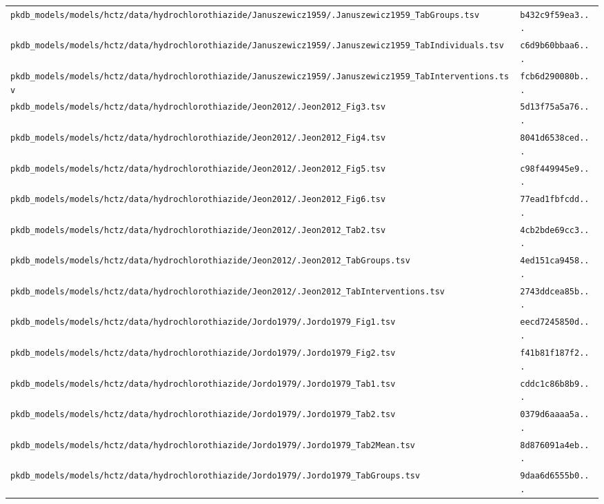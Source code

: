 \begin{longtable}{ll}
\texttt{pkdb\_models/models/hctz/data/hydrochlorothiazide/Januszewicz1959/.Januszewicz1959\_TabGroups.tsv} & \texttt{b432c9f59ea3...} \\
\texttt{pkdb\_models/models/hctz/data/hydrochlorothiazide/Januszewicz1959/.Januszewicz1959\_TabIndividuals.tsv} & \texttt{c6d9b60bbaa6...} \\
\texttt{pkdb\_models/models/hctz/data/hydrochlorothiazide/Januszewicz1959/.Januszewicz1959\_TabInterventions.tsv} & \texttt{fcb6d290080b...} \\
\texttt{pkdb\_models/models/hctz/data/hydrochlorothiazide/Jeon2012/.Jeon2012\_Fig3.tsv} & \texttt{5d13f75a5a76...} \\
\texttt{pkdb\_models/models/hctz/data/hydrochlorothiazide/Jeon2012/.Jeon2012\_Fig4.tsv} & \texttt{8041d6538ced...} \\
\texttt{pkdb\_models/models/hctz/data/hydrochlorothiazide/Jeon2012/.Jeon2012\_Fig5.tsv} & \texttt{c98f449945e9...} \\
\texttt{pkdb\_models/models/hctz/data/hydrochlorothiazide/Jeon2012/.Jeon2012\_Fig6.tsv} & \texttt{77ead1fbfcdd...} \\
\texttt{pkdb\_models/models/hctz/data/hydrochlorothiazide/Jeon2012/.Jeon2012\_Tab2.tsv} & \texttt{4cb2bde69cc3...} \\
\texttt{pkdb\_models/models/hctz/data/hydrochlorothiazide/Jeon2012/.Jeon2012\_TabGroups.tsv} & \texttt{4ed151ca9458...} \\
\texttt{pkdb\_models/models/hctz/data/hydrochlorothiazide/Jeon2012/.Jeon2012\_TabInterventions.tsv} & \texttt{2743ddcea85b...} \\
\texttt{pkdb\_models/models/hctz/data/hydrochlorothiazide/Jordo1979/.Jordo1979\_Fig1.tsv} & \texttt{eecd7245850d...} \\
\texttt{pkdb\_models/models/hctz/data/hydrochlorothiazide/Jordo1979/.Jordo1979\_Fig2.tsv} & \texttt{f41b81f187f2...} \\
\texttt{pkdb\_models/models/hctz/data/hydrochlorothiazide/Jordo1979/.Jordo1979\_Tab1.tsv} & \texttt{cddc1c86b8b9...} \\
\texttt{pkdb\_models/models/hctz/data/hydrochlorothiazide/Jordo1979/.Jordo1979\_Tab2.tsv} & \texttt{0379d6aaaa5a...} \\
\texttt{pkdb\_models/models/hctz/data/hydrochlorothiazide/Jordo1979/.Jordo1979\_Tab2Mean.tsv} & \texttt{8d876091a4eb...} \\
\texttt{pkdb\_models/models/hctz/data/hydrochlorothiazide/Jordo1979/.Jordo1979\_TabGroups.tsv} & \texttt{9daa6d6555b0...} \\

\end{longtable}
